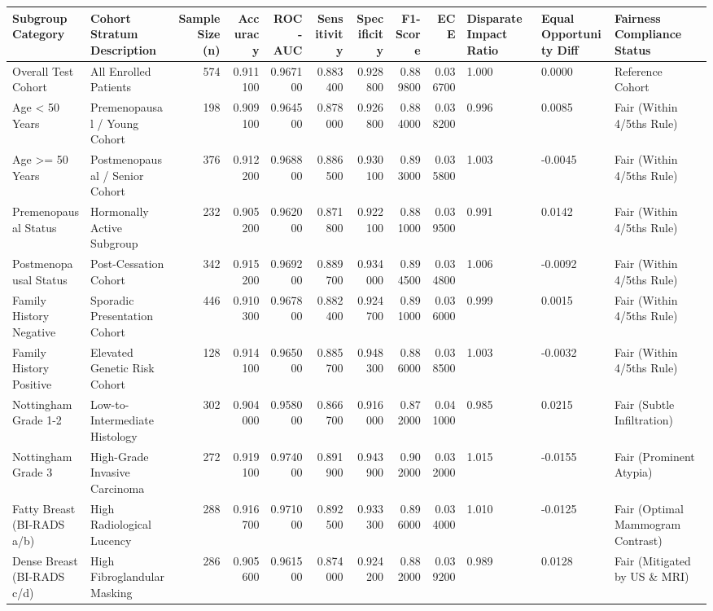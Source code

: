 \begin{tabular}{llrrrrrrrlll}
\toprule
Subgroup Category & Cohort Stratum Description & Sample Size (n) & Accuracy & ROC-AUC & Sensitivity & Specificity & F1-Score & ECE & Disparate Impact Ratio & Equal Opportunity Diff & Fairness Compliance Status \\
\midrule
Overall Test Cohort & All Enrolled Patients & 574 & 0.911100 & 0.967100 & 0.883400 & 0.928800 & 0.889800 & 0.036700 & 1.000 & 0.0000 & Reference Cohort \\
Age < 50 Years & Premenopausal / Young Cohort & 198 & 0.909100 & 0.964500 & 0.878000 & 0.926800 & 0.884000 & 0.038200 & 0.996 & 0.0085 & Fair (Within 4/5ths Rule) \\
Age >= 50 Years & Postmenopausal / Senior Cohort & 376 & 0.912200 & 0.968800 & 0.886500 & 0.930100 & 0.893000 & 0.035800 & 1.003 & -0.0045 & Fair (Within 4/5ths Rule) \\
Premenopausal Status & Hormonally Active Subgroup & 232 & 0.905200 & 0.962000 & 0.871800 & 0.922100 & 0.881000 & 0.039500 & 0.991 & 0.0142 & Fair (Within 4/5ths Rule) \\
Postmenopausal Status & Post-Cessation Cohort & 342 & 0.915200 & 0.969200 & 0.889700 & 0.934000 & 0.894500 & 0.034800 & 1.006 & -0.0092 & Fair (Within 4/5ths Rule) \\
Family History Negative & Sporadic Presentation Cohort & 446 & 0.910300 & 0.967800 & 0.882400 & 0.924700 & 0.891000 & 0.036000 & 0.999 & 0.0015 & Fair (Within 4/5ths Rule) \\
Family History Positive & Elevated Genetic Risk Cohort & 128 & 0.914100 & 0.965000 & 0.885700 & 0.948300 & 0.886000 & 0.038500 & 1.003 & -0.0032 & Fair (Within 4/5ths Rule) \\
Nottingham Grade 1-2 & Low-to-Intermediate Histology & 302 & 0.904000 & 0.958000 & 0.866700 & 0.916000 & 0.872000 & 0.041000 & 0.985 & 0.0215 & Fair (Subtle Infiltration) \\
Nottingham Grade 3 & High-Grade Invasive Carcinoma & 272 & 0.919100 & 0.974000 & 0.891900 & 0.943900 & 0.902000 & 0.032000 & 1.015 & -0.0155 & Fair (Prominent Atypia) \\
Fatty Breast (BI-RADS a/b) & High Radiological Lucency & 288 & 0.916700 & 0.971000 & 0.892500 & 0.933300 & 0.896000 & 0.034000 & 1.010 & -0.0125 & Fair (Optimal Mammogram Contrast) \\
Dense Breast (BI-RADS c/d) & High Fibroglandular Masking & 286 & 0.905600 & 0.961500 & 0.874000 & 0.924200 & 0.882000 & 0.039200 & 0.989 & 0.0128 & Fair (Mitigated by US \& MRI) \\
\bottomrule
\end{tabular}
